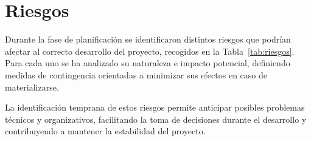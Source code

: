 \section{Riesgos}

Durante la fase de planificación se identificaron distintos riesgos que podrían afectar al correcto desarrollo del proyecto, recogidos en la Tabla~\ref{tab:riesgos}. Para cada uno se ha analizado su naturaleza e impacto potencial, definiendo medidas de contingencia orientadas a minimizar sus efectos en caso de materializarse.

La identificación temprana de estos riesgos permite anticipar posibles problemas técnicos y organizativos, facilitando la toma de decisiones durante el desarrollo y contribuyendo a mantener la estabilidad del proyecto.

